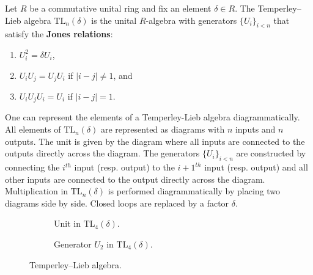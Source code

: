     \begin{example}
        Let $R$ be a commutative unital ring and fix an element $\delta\in R$. The Temperley--Lieb algebra $\mathrm{TL}_n(\delta)$ is the unital $R$-algebra with generators $\{U_i\}_{i<n}$ that satisfy the \textbf{Jones relations}:
        \begin{enumerate}
            \item $U_i^2 = \delta U_i$,
            \item $U_i U_j = U_j U_i$ if $|i-j|\neq 1$, and
            \item $U_i U_j U_i = U_i$ if $|i-j| = 1$.
        \end{enumerate}
        One can represent the elements of a Temperley-Lieb algebra diagrammatically. All elements of $\mathrm{TL}_n(\delta)$ are represented as diagrams with $n$ inputs and $n$ outputs. The unit is given by the diagram where all inputs are connected to the outputs directly across the diagram. The generators $\{U_i\}_{i<n}$ are constructed by connecting the $i^{th}$ input (resp. output) to the $i+1^{th}$ input (resp. output) and all other inputs are connected to the output directly across the diagram. Multiplication in $\text{TL}_n(\delta)$ is performed diagrammatically by placing two diagrams side by side. Closed loops are replaced by a factor $\delta$.
    \end{example}

    \begin{figure}[ht!]
        \centering
        \begin{subfigure}{0.49\textwidth}
            \centering
            \caption{Unit in $\mathrm{TL}_4(\delta)$.}
            \label{fig:unit_temperley_lieb}
        \end{subfigure}
        \begin{subfigure}{0.49\textwidth}
            \centering
            \caption{Generator $U_2$ in $\mathrm{TL}_4(\delta)$.}
            \label{fig:generator_temperley_lieb}
        \end{subfigure}
        \caption{Temperley--Lieb algebra.}
    \end{figure}

